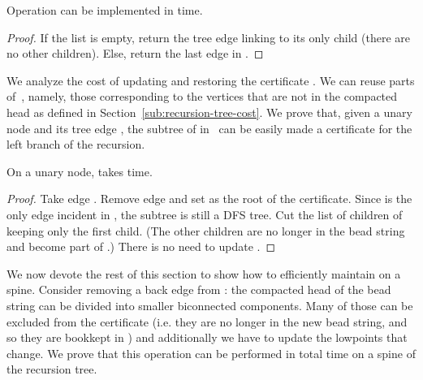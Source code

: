 \begin{lemma}
	\label{lem:choose}
	Operation  can be implemented in  time.
\end{lemma}
\begin{proof}
If the list  is empty, return the tree edge  linking 
to its only child  (there are no other children).  Else,
return the last edge in . 
\end{proof}

We analyze the cost of updating and restoring the
certificate . We can reuse parts of~,
namely, those corresponding to the vertices that are not in the
compacted head  as defined in
Section~\ref{sub:recursion-tree-cost}.
We prove that, given a unary node  and its tree edge , the
subtree of  in~ can be easily made a certificate for the left
branch of the recursion.

\begin{lemma}
	\label{lem:unary_left}
	On a unary node,  takes 
	time.
\end{lemma}
\begin{proof}
	Take edge . Remove edge  and set  as the root
	of the certificate. Since  is the only edge incident in
	, the subtree  is still a DFS tree. Cut the list of children
	of  keeping only the first child. (The other children are no
	longer in the bead string and become part of .) There is
	no need to update . 
\end{proof}

We now devote the rest of this section to show how to efficiently
maintain  on a spine.  Consider removing a back edge  from :
the compacted head  of the bead string can be divided
into smaller biconnected components.  Many of those can be excluded
from the certificate (i.e. they are no longer in the new bead string,
and so they are bookkept in ) and additionally we have to update
the lowpoints that change. We prove that this operation can be
performed in  total time on a spine of the recursion tree.

